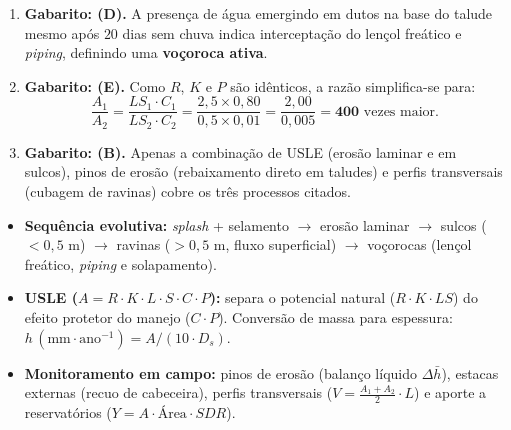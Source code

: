 \begin{boxGabarito}
\begin{enumerate}[leftmargin=1.6em, itemsep=4pt]
  \item \textbf{Gabarito: (D).} A presença de água emergindo em dutos na base do talude mesmo após $20$ dias sem chuva indica interceptação do lençol freático e \textit{piping}, definindo uma \textbf{voçoroca ativa}.
  \item \textbf{Gabarito: (E).} Como $R$, $K$ e $P$ são idênticos, a razão simplifica-se para:
  \[
  \frac{A_1}{A_2} = \frac{LS_1 \cdot C_1}{LS_2 \cdot C_2} = \frac{2{,}5 \times 0{,}80}{0{,}5 \times 0{,}01} = \frac{2{,}00}{0{,}005} = \mathbf{400}\text{ vezes maior.}
  \]
  \item \textbf{Gabarito: (B).} Apenas a combinação de USLE (erosão laminar e em sulcos), pinos de erosão (rebaixamento direto em taludes) e perfis transversais (cubagem de ravinas) cobre os três processos citados.
\end{enumerate}
\end{boxGabarito}

\begin{boxResumo}
\begin{itemize}[leftmargin=1.4em, itemsep=2.5pt]
  \item \textbf{Sequência evolutiva:} \textit{splash} + selamento $\rightarrow$ erosão laminar $\rightarrow$ sulcos ($<0{,}5\text{ m}$) $\rightarrow$ ravinas ($>0{,}5\text{ m}$, fluxo superficial) $\rightarrow$ voçorocas (lençol freático, \textit{piping} e solapamento).
  \item \textbf{USLE ($A = R \cdot K \cdot L \cdot S \cdot C \cdot P$):} separa o potencial natural ($R\cdot K\cdot LS$) do efeito protetor do manejo ($C\cdot P$). Conversão de massa para espessura: $h\,(\text{mm}\cdot\text{ano}^{-1}) = A / (10 \cdot D_s)$.
  \item \textbf{Monitoramento em campo:} pinos de erosão (balanço líquido $\Delta \bar{h}$), estacas externas (recuo de cabeceira), perfis transversais ($V = \frac{A_1+A_2}{2}\cdot L$) e aporte a reservatórios ($Y = A \cdot \text{Área} \cdot SDR$).
\end{itemize}
\end{boxResumo}

